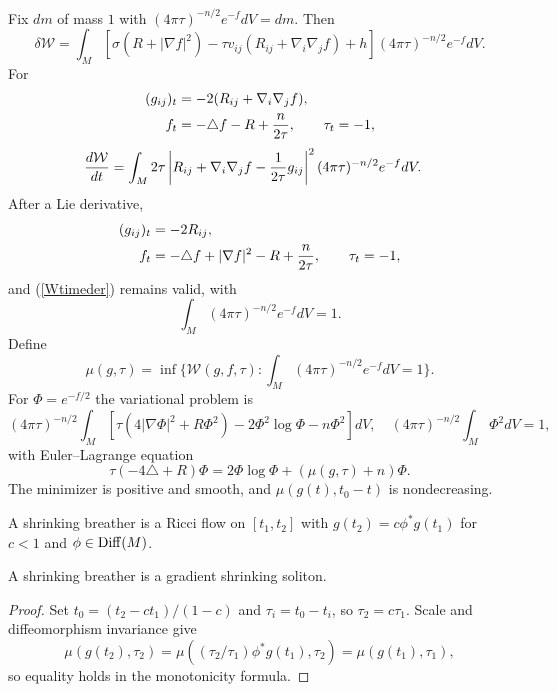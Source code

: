 Fix $dm$ of mass $1$ with $(4\pi\tau)^{-n/2}e^{-f}dV=dm$. Then
\begin{equation}\label{Wvar}
\delta {\mathcal W}=\int_M[\sigma(R+|\nabla f|^2)-\tau v_{ij}(R_{ij}+\nabla_i\nabla_jf)+h](4\pi\tau)^{-n/2}e^{-f}dV.
\end{equation}
For
\begin{align}\label{oldeqn}
(g_{ij})_t&=-2(R_{ij}+\nabla_i\nabla_jf),\\
f_t&=-\triangle f-R+{n\over2\tau},\qquad\tau_t=-1,\notag
\end{align}
\begin{align}\label{Wtimeder}
{d{\mathcal W}\over dt}&=\int_M2\tau\left|R_{ij}+\nabla_i\nabla_jf-{1\over2\tau}g_{ij}\right|^2(4\pi\tau)^{-n/2}e^{-f}dV.
\end{align}
After a Lie derivative,
\begin{align}\label{neweqn}
(g_{ij})_t&=-2R_{ij},\\
f_t&=-\triangle f+|\nabla f|^2-R+{n\over2\tau},\qquad\tau_t=-1,\notag
\end{align}
and (\ref{Wtimeder}) remains valid, with
\begin{equation}\label{Wnorm}\int_M(4\pi\tau)^{-n/2}e^{-f}dV=1.\end{equation}
Define
\begin{equation}
\mu(g,\tau)=\inf\{{\mathcal W}(g,f,\tau):\int_M(4\pi\tau)^{-n/2}e^{-f}dV=1\}.
\end{equation}
For $\Phi=e^{-f/2}$ the variational problem is
\begin{equation}
(4\pi\tau)^{-n/2}\int_M[\tau(4|\nabla\Phi|^2+R\Phi^2)-2\Phi^2\log\Phi-n\Phi^2]dV,
\quad(4\pi\tau)^{-n/2}\int_M\Phi^2dV=1,
\end{equation}
with Euler--Lagrange equation
\begin{equation}
\tau(-4\triangle+R)\Phi=2\Phi\log\Phi+(\mu(g,\tau)+n)\Phi.
\end{equation}
The minimizer is positive and smooth, and $\mu(g(t),t_0-t)$ is nondecreasing.

\begin{definition}
  \label{def:kl-w-entropy-shrinking-breather-definition}
A shrinking breather is a Ricci flow on $[t_1,t_2]$ with
$g(t_2)=c\phi^*g(t_1)$ for $c<1$ and $\phi\in\operatorname{Diff}(M)$.
\end{definition}
\begin{proposition}
  \label{prop:kl-w-entropy-rigidity-shrinking-breathers}
A shrinking breather is a gradient shrinking soliton.
\end{proposition}
\begin{proof}
\sketch
Set $t_0=(t_2-ct_1)/(1-c)$ and $\tau_i=t_0-t_i$, so $\tau_2=c\tau_1$. Scale and
diffeomorphism invariance give
\begin{equation}
\mu(g(t_2),\tau_2)=\mu((\tau_2/\tau_1)\phi^*g(t_1),\tau_2)=\mu(g(t_1),\tau_1),
\end{equation}
so equality holds in the monotonicity formula.
\end{proof}

